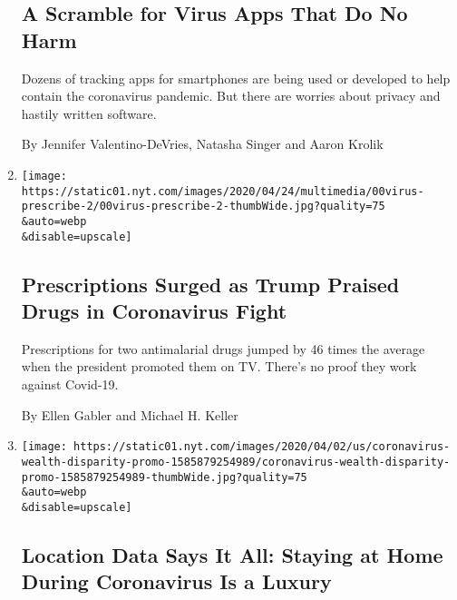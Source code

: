 \begin{enumerate}
  \hypertarget{a-scramble-for-virus-apps-that-do-no-harm}{%
  \subsection{A Scramble for Virus Apps That Do No
  Harm}\label{a-scramble-for-virus-apps-that-do-no-harm}}

  Dozens of tracking apps for smartphones are being used or developed to
  help contain the coronavirus pandemic. But there are worries about
  privacy and hastily written software.

  By Jennifer Valentino-DeVries, Natasha Singer and Aaron Krolik
\item
  \href{/2020/04/25/us/coronavirus-trump-chloroquine-hydroxychloroquine.html}{}

  \texttt{[image: https://static01.nyt.com/images/2020/04/24/multimedia/00virus-prescribe-2/00virus-prescribe-2-thumbWide.jpg?quality=75\\\&auto=webp\\\&disable=upscale]}

  \hypertarget{prescriptions-surged-as-trump-praised-drugs-in-coronavirus-fight}{%
  \subsection{Prescriptions Surged as Trump Praised Drugs in Coronavirus
  Fight}\label{prescriptions-surged-as-trump-praised-drugs-in-coronavirus-fight}}

  Prescriptions for two antimalarial drugs jumped by 46 times the
  average when the president promoted them on TV. There's no proof they
  work against Covid-19.

  By Ellen Gabler and Michael H. Keller
\item
  \href{/interactive/2020/04/03/us/coronavirus-stay-home-rich-poor.html}{}

  \texttt{[image: https://static01.nyt.com/images/2020/04/02/us/coronavirus-wealth-disparity-promo-1585879254989/coronavirus-wealth-disparity-promo-1585879254989-thumbWide.jpg?quality=75\\\&auto=webp\\\&disable=upscale]}

  \hypertarget{location-data-says-it-all-staying-at-home-during-coronavirus-is-a-luxury}{%
  \subsection{Location Data Says It All: Staying at Home During
  Coronavirus Is a
  Luxury}\label{location-data-says-it-all-staying-at-home-during-coronavirus-is-a-luxury}}


\end{enumerate}
